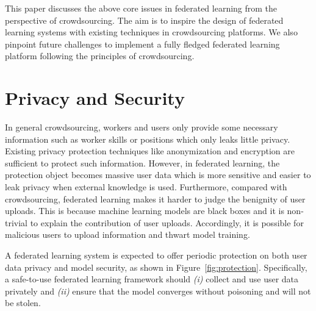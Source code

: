 \documentclass[11pt]{article}
\newcommand\figref[1]{Figure~\ref{#1}}
\newcommand\secref[1]{Section~\ref{#1}}
\begin{document}
This paper discusses the above core issues in federated learning from the perspective of crowdsourcing.
The aim is to inspire the design of federated learning systems with existing techniques in crowdsourcing platforms. 
We also pinpoint future challenges to implement a fully fledged federated learning platform following the principles of crowdsourcing.


\section{Privacy and Security}
In general crowdsourcing, workers and users only provide some necessary information such as worker skills or positions which only leaks little privacy.
Existing privacy protection techniques like anonymization and encryption are sufficient to protect such information.
However, in federated learning, the protection object becomes massive user data which is more sensitive and easier to leak privacy when external knowledge is used.
Furthermore, compared with crowdsourcing, federated learning makes it harder to judge the benignity of user uploads.
This is because machine learning models are black boxes and it is non-trivial to explain the contribution of user uploads.
Accordingly, it is possible for malicious users to upload information and thwart model training.


A federated learning system is expected to offer periodic protection on both user data privacy and model security, as shown in \figref{fig:protection}.
Specifically, a safe-to-use federated learning framework should 
\textit{(i)} collect and use user data privately and 
\textit{(ii)} ensure that the model converges without poisoning and will not be stolen.
\end{document}
